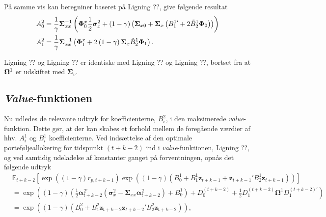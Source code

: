 \documentclass[
  a4paper,
  oneside]{memoir}
\begin{document}
På samme vis kan beregniner baseret på Ligning ??, give følgende resultat
\begin{align*}
A_0^2&=\frac{1}{\gamma} \bm{\Sigma}_{xx}^{-1} \left(\bm{\Phi}_0^x \frac{1}{2} \bm{\sigma}_x^2 + \left(1-\gamma \right) \left(\bm{\Sigma}_{x0} + \bm{\Sigma}_x \left(B_1^{1\prime} + 2\Tilde{B}_2^{1}\bm{\Phi}_0 \right)\right)\right)\\
A_1^2&=\frac{1}{\gamma} \bm{\Sigma}_{xx}^{-1} \left(\bm{\Phi}_1^x + 2\left(1-\gamma\right) \bm{\Sigma}_x \Tilde{B}_2^{1}\bm{\Phi}_1\right).
\end{align*}

Ligning ?? og Ligning ?? er identiske med Ligning ?? og Ligning ??, bortset fra at \(\Tilde{\bm{\Omega}}^1\) er udskiftet med \(\bm{\Sigma}_v\).

\hypertarget{value-funktionen-1}{%
\subsection{\texorpdfstring{\emph{Value}-funktionen}{Value-funktionen}}\label{value-funktionen-1}}

Nu udledes de relevante udtryk for koefficienterne, \(B_i^2\), i den maksimerede \emph{value}-funktion. Dette gør, at der kan skabes et forhold mellem de foregående værdier af hhv. \(A_i^1\) og \(B_i^1\) koefficienterne. Ved indsættelse af den optimale porteføljeallokering for tidspunkt \(\left(t+k-2\right)\) ind i \emph{value}-funktionen, Ligning ??, og ved samtidig udeladelse af konstanter ganget på forventningen, opnås det følgende udtryk
\begin{align*}
&\mathbb{E}_{t+k-2}[ \exp\left( \left(1-\gamma\right)  r_{p,t+k-1}\right)\exp \left( \left(1-\gamma\right) \left(B_0^1 + B_1^1\bm{z}_{t+k-1}  + \bm{z}_{t+k-1}' B_2^1 \bm{z}_{t+k-1}  \right)\right)]\\
&=\exp\left(\left(1-\gamma\right)\left(\frac{1}{2}\bm{\alpha}_{t+k-2}^{2\prime} \left(\bm{\sigma}_x^2 - \bm{\Sigma}_{xx} \bm{\alpha}_{t+k-2}^2\right) + B_0^1 \right) + D_0^{\left(t+k-2\right)} + \frac{1}{2} D_1^{\left(t+k-2\right)} \bm{\Omega}^1 D_1^{\left(t+k-2\right)\prime}\right)\\
&=\exp\left(\left(1-\gamma\right)\left(B_0^2 + B_1^2 \bm{z}_{t+k-2} \bm{z}_{t+k-2}' B_2^2 \bm{z}_{t+k-2} \right)\right),
\end{align*}
\end{document}
